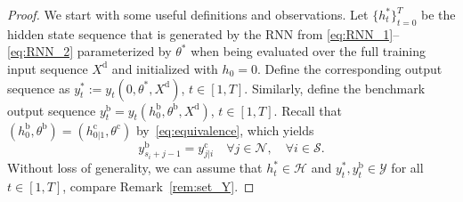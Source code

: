 \documentclass{article} %
\begin{document}
\begin{proof}
	We start with some useful definitions and observations.
	Let $\{h^*_t\}_{t=0}^T$ be the hidden state sequence that is generated by the RNN from \eqref{eq:RNN_1}--\eqref{eq:RNN_2} parameterized by $\theta^*$ when being evaluated over the full training input sequence $X^\mathrm{d}$ and initialized with $h_0=0$. Define the corresponding output sequence as $y^*_t:=y_t(0,\theta^*,X^\mathrm{d})$, $t\in[1,T]$.
	Similarly, define the benchmark output sequence $y_t^\mathrm{b} = y_t(h_{0}^\mathrm{b},\theta^\mathrm{b},X^\mathrm{d})$, $t\in[1,T]$.
	Recall that $(h_0^\mathrm{b},\theta^\mathrm{b}) = (h_{0|1}^\mathrm{c},\theta^\mathrm{c})$  by~\eqref{eq:equivalence}, which yields
	\begin{equation}\label{eq:equivalence_Y}
		y^\mathrm{b}_{s_i+j-1}=y^\mathrm{c}_{j|i} \quad \forall j\in\mathcal{N},\quad \forall i\in\mathcal{S}.
	\end{equation}
	Without loss of generality, we can assume that $h^*_t\in\mathcal{H}$ and $y^*_t,y^\mathrm{b}_t\in\mathcal{Y}$ for all $t\in[1,T]$, compare Remark~\ref{rem:set_Y}.
	

\end{proof}
\end{document}
